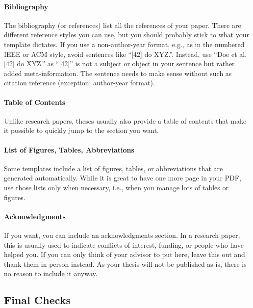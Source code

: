 \documentclass[a4]{article}
\begin{document}
\paragraph{Bibliography}

The bibliography (or references) list all the references of your paper.
There are different reference styles you can use, but you should probably stick to what your template dictates.
If you use a non-author-year format, e.g., as in the numbered IEEE or ACM style, avoid sentences like ``[42] do XYZ.''.
Instead, use ``Doe et al. [42] do XYZ.'' as ``[42]'' is not a subject or object in your sentence but rather added meta-information.
The sentence needs to make sense without such as citation reference (exception: author-year format).

\paragraph{Table of Contents}

Unlike research papers, theses usually also provide a table of contents that make it possible to quickly jump to the section you want.

\paragraph{List of Figures, Tables, Abbreviations}

Some templates include a list of figures, tables, or abbreviations that are generated automatically.
While it is great to have one more page in your PDF, use those lists only when necessary, i.e., when you manage lots of tables or figures.

\paragraph{Acknowledgments}

If you want, you can include an acknowledgments section.
In a research paper, this is usually used to indicate conflicts of interest, funding, or people who have helped you.
If you can only think of your advisor to put here, leave this out and thank them in person instead.
As your thesis will not be published as-is, there is no reason to include it anyway.

\subsection{Final Checks}
\end{document}
